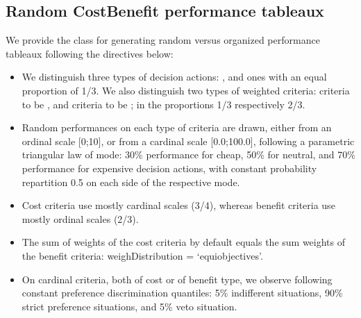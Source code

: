 \documentclass[a4paper,12pt,english]{sphinxhowto}
\begin{document}
\subsection{Random Cost\sphinxhyphen{}Benefit performance tableaux}
\label{\detokenize{tutorial:random-cost-benefit-performance-tableaux}}\label{\detokenize{tutorial:cost-benefit-performance-tableau-label}}
We provide the  class for generating random  versus  organized performance tableaux following the directives below:
\begin{itemize}
\item {} 
We distinguish three types of decision actions: ,  and  ones with an equal proportion of 1/3. We also distinguish two types of weighted criteria:  criteria to be , and  criteria to be ; in the proportions 1/3 respectively 2/3.

\item {} 
Random performances on each type of criteria  are drawn, either from an ordinal scale {[}0;10{]}, or from a cardinal scale {[}0.0;100.0{]}, following a parametric triangular law of mode: 30\% performance for cheap, 50\% for neutral, and 70\% performance for expensive decision actions, with constant probability repartition 0.5 on each side of the respective mode.

\item {} 
Cost criteria use mostly cardinal scales (3/4), whereas benefit criteria use mostly ordinal scales (2/3).

\item {} 
The sum of weights of the cost criteria by default equals the sum weights of the benefit criteria: weighDistribution = ‘equiobjectives’.

\item {} 
On cardinal criteria, both of cost or of benefit type, we observe following constant preference discrimination quantiles: 5\% indifferent situations, 90\% strict preference situations, and 5\% veto situation.

\end{itemize}
\end{document}
